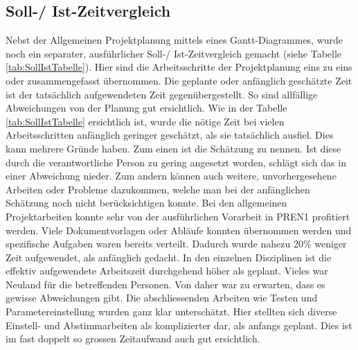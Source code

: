 \subsection{Soll-/ Ist-Zeitvergleich}
\label{sec:SollIstVergleich}
Nebst der Allgemeinen Projektplanung mittels eines Gantt-Diagrammes, wurde noch ein separater, 
ausführlicher Soll-/ Ist-Zeitvergleich gemacht (siehe Tabelle \ref{tab:SollIstTabelle}). 
Hier sind die Arbeitsschritte der  Projektplanung eins zu eins oder zusammengefasst übernommen. 
Die geplante oder anfänglich geschätzte  Zeit ist der tatsächlich aufgewendeten Zeit 
gegenübergestellt. So sind allfällige Abweichungen von  der Planung gut ersichtlich. Wie in 
der Tabelle \ref{tab:SollIstTabelle} ersichtlich ist, wurde die nötige Zeit bei vielen 
Arbeitsschritten   anfänglich geringer geschätzt, als sie tatsächlich ausfiel. Dies kann mehrere 
Gründe haben. Zum einen ist die Schätzung zu nennen. Ist diese durch die verantwortliche 
Person zu gering angesetzt worden, schlägt sich das in einer Abweichung nieder. Zum andern 
können auch weitere, unvorhergesehene Arbeiten oder Probleme dazukommen, welche man bei der 
anfänglichen Schätzung noch nicht berücksichtigen konnte. Bei den allgemeinen Projektarbeiten 
konnte sehr von der ausführlichen Vorarbeit in PREN1 profitiert werden. Viele Dokumentvorlagen 
oder Abläufe konnten übernommen werden und spezifische Aufgaben waren bereits verteilt. Dadurch 
wurde nahezu 20\% weniger Zeit aufgewendet, als anfänglich gedacht. In den einzelnen Disziplinen 
ist die effektiv aufgewendete Arbeitszeit durchgehend höher als geplant. Vieles war Neuland für 
die betreffenden Personen. Von daher war zu erwarten, dass es gewisse Abweichungen gibt. Die 
abschliessenden Arbeiten wie Testen und Parametereinstellung wurden ganz klar unterschätzt. 
Hier stellten sich diverse Einstell- und Abstimmarbeiten als komplizierter dar, als anfangs 
geplant. Dies ist im fast doppelt so grossen Zeitaufwand auch gut ersichtlich. 
